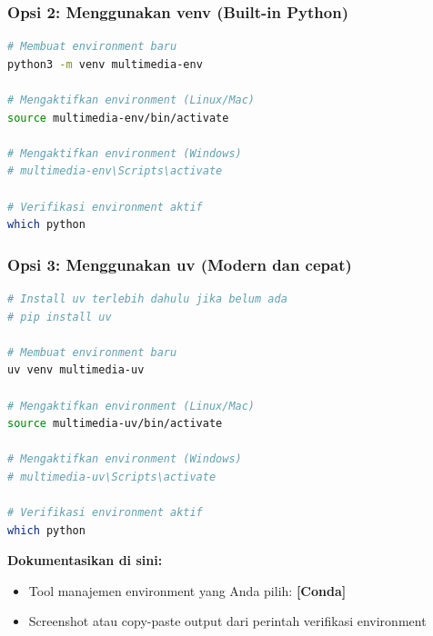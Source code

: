 \documentclass[11pt,a4paper]{article}
\begin{document}
\subsubsection{Opsi 2: Menggunakan venv (Built-in Python)}
\begin{lstlisting}[language=bash, caption=Membuat environment dengan venv]
# Membuat environment baru
python3 -m venv multimedia-env

# Mengaktifkan environment (Linux/Mac)
source multimedia-env/bin/activate

# Mengaktifkan environment (Windows)
# multimedia-env\Scripts\activate

# Verifikasi environment aktif
which python
\end{lstlisting}

\subsubsection{Opsi 3: Menggunakan uv (Modern dan cepat)}
\begin{lstlisting}[language=bash, caption=Membuat environment dengan uv]
# Install uv terlebih dahulu jika belum ada
# pip install uv

# Membuat environment baru
uv venv multimedia-uv

# Mengaktifkan environment (Linux/Mac)
source multimedia-uv/bin/activate

# Mengaktifkan environment (Windows)
# multimedia-uv\Scripts\activate

# Verifikasi environment aktif
which python
\end{lstlisting}

\textbf{Dokumentasikan di sini:}
\begin{itemize}
    \item Tool manajemen environment yang Anda pilih: \textbf{[Conda]}
    \item Screenshot atau copy-paste output dari perintah verifikasi environment
\end{itemize}
\end{document}
